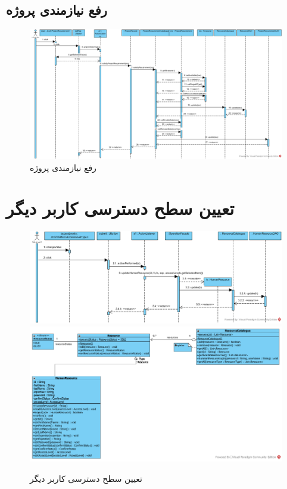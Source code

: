 \begin{landscape}
\section{رفع نیازمندی پروژه}
\begin{figure}[H]
	\centering
	\includegraphics[scale=0.5]{img/sequence-design/SatisfyResourceOfProject}
	\caption{رفع نیازمندی پروژه}
\end{figure}
\end{landscape}

\section{تعیین سطح دسترسی کاربر دیگر}
\begin{figure}[H]
	\centering
	\includegraphics[scale=0.55]{img/sequence-design/SetUserAccessLevel}
	\includegraphics[scale=0.6]{img/sequence-design/SetUserAccessLevelC}
	\caption{تعیین سطح دسترسی کاربر دیگر}
\end{figure}


